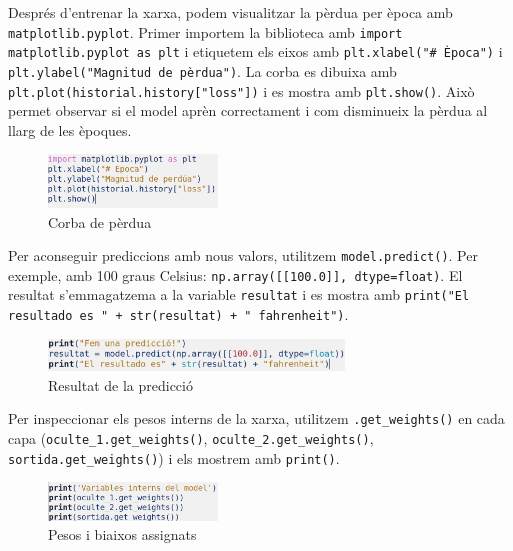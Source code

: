 Després d’entrenar la xarxa, podem visualitzar la pèrdua per època amb \texttt{matplotlib.pyplot}. Primer importem la biblioteca amb \texttt{import matplotlib.pyplot as plt} i etiquetem els eixos amb \texttt{plt.xlabel("\# Època")} i \texttt{plt.ylabel("Magnitud de pèrdua")}. La corba es dibuixa amb \texttt{plt.plot(historial.history["loss"])} i es mostra amb \texttt{plt.show()}. Això permet observar si el model aprèn correctament i com disminueix la pèrdua al llarg de les èpoques.

\begin{figure}[H]

\centering

\includegraphics[width=0.4\textwidth]{./figures/7.png}

\caption{Corba de pèrdua}

\end{figure}

Per aconseguir prediccions amb nous valors, utilitzem \texttt{model.predict()}. Per exemple, amb 100 graus Celsius: \texttt{np.array([[100.0]], dtype=float)}. El resultat s’emmagatzema a la variable \texttt{resultat} i es mostra amb \texttt{print("El resultado es " + str(resultat) + " fahrenheit")}.

\begin{figure}[H]

\centering

\includegraphics[width=0.7\textwidth]{./figures/8.png}

\caption{Resultat de la predicció}

\end{figure}

Per inspeccionar els pesos interns de la xarxa, utilitzem \texttt{.get\_weights()} en cada capa (\texttt{oculte\_1.get\_weights()}, \texttt{oculte\_2.get\_weights()}, \texttt{sortida.get\_weights()}) i els mostrem amb \texttt{print()}.

\begin{figure}[H]

\centering

\includegraphics[width=0.4\textwidth]{./figures/9.png}

\caption{Pesos i biaixos assignats}

\end{figure}

